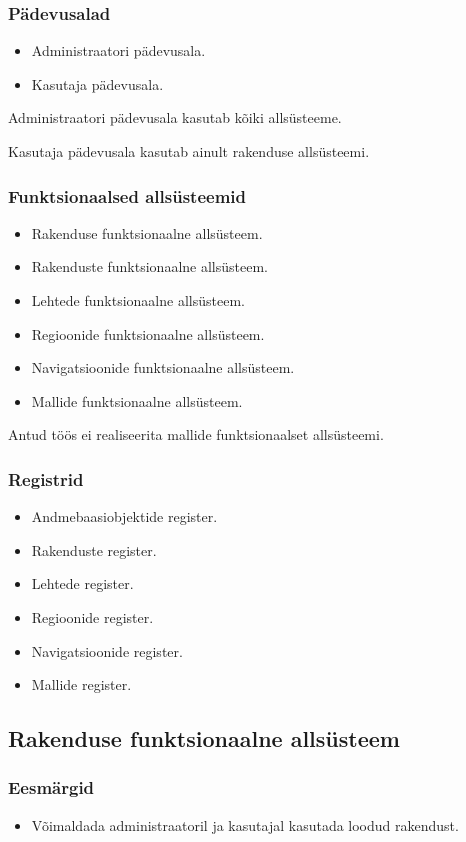 \documentclass[a4paper,12pt]{article} %
\begin{document}
\subsubsection{Pädevusalad}
\begin{itemize}
\item Administraatori pädevusala.
\item Kasutaja pädevusala.
\end{itemize}
Administraatori pädevusala kasutab kõiki allsüsteeme.\par
Kasutaja pädevusala kasutab ainult rakenduse allsüsteemi.
\subsubsection{Funktsionaalsed allsüsteemid}
\begin{itemize}
\item Rakenduse funktsionaalne allsüsteem.
\item Rakenduste funktsionaalne allsüsteem.
\item Lehtede funktsionaalne allsüsteem.
\item Regioonide funktsionaalne allsüsteem.
\item Navigatsioonide funktsionaalne allsüsteem.
\item Mallide funktsionaalne allsüsteem.
\end{itemize}
Antud töös ei realiseerita mallide funktsionaalset allsüsteemi.
\subsubsection{Registrid}
\begin{itemize}
\item Andmebaasiobjektide register.
\item Rakenduste register.
\item Lehtede register.
\item Regioonide register.
\item Navigatsioonide register.
\item Mallide register.
\end{itemize}

\subsection{Rakenduse funktsionaalne allsüsteem}
\subsubsection{Eesmärgid}
\begin{itemize}
\item Võimaldada administraatoril ja kasutajal kasutada loodud rakendust.
\end{itemize}
\end{document}
